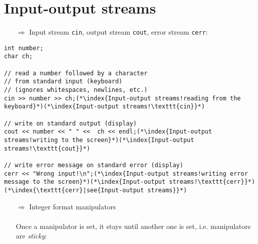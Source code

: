 \documentclass[10pt]{article}
\begin{document}
\section{Input-output streams}
\small
\begin{enumerate}
\item[$\Rightarrow$] Input stream \texttt{cin}, output stream \texttt{cout}, error stream \texttt{cerr}:
\end{enumerate}
\begin{lstlisting}
int number;
char ch;

// read a number followed by a character
// from standard input (keyboard)
// (ignores whitespaces, newlines, etc.)
cin >> number >> ch;(*\index{Input-output streams!reading from the keyboard}*)(*\index{Input-output streams!\texttt{cin}}*)

// write on standard output (display)
cout << number << " " <<  ch << endl;(*\index{Input-output streams!writing to the screen}*)(*\index{Input-output streams!\texttt{cout}}*)

// write error message on standard error (display)
cerr << "Wrong input!\n";(*\index{Input-output streams!writing error message to the screen}*)(*\index{Input-output streams!\texttt{cerr}}*)(*\index{\texttt{cerr}|see{Input-output streams}}*)
\end{lstlisting}
\begin{enumerate}
\item[$\Rightarrow$] Integer format manipulators\\ \\ Once a  manipulator is set, it stays until another one is set, i.e. manipulators are \emph{sticky}:
\end{enumerate}
\end{document}
